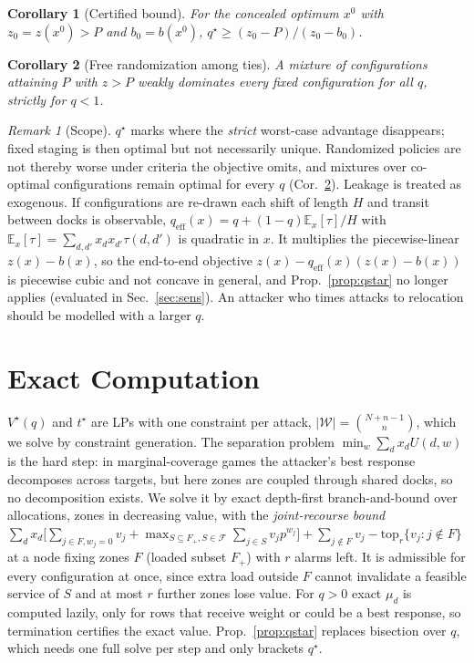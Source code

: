 \documentclass[letterpaper,journal]{IEEEtran}
\newtheorem{corollary}{Corollary}
\theoremstyle{remark}
\newtheorem{remark}{Remark}
\newcommand{\W}{\mathcal{W}}
\begin{document}
\begin{corollary}[Certified bound]\label{cor:lb}
For the concealed optimum $x^0$ with $z_0=z(x^0)>P$ and $b_0=b(x^0)$, $q^\star\ge(z_0-P)/(z_0-b_0)$.
\end{corollary}
\begin{corollary}[Free randomization among ties]\label{cor:ties}
A mixture of configurations attaining $P$ with $z>P$ weakly dominates every fixed configuration for all $q$, strictly for $q<1$.
\end{corollary}

\begin{remark}[Scope]\label{rem:scope}
$q^\star$ marks where the \emph{strict} worst-case advantage disappears; fixed staging is then optimal but not necessarily unique. Randomized policies are not thereby worse under criteria the objective omits, and mixtures over co-optimal configurations remain optimal for every $q$ (Cor.~\ref{cor:ties}). Leakage is treated as exogenous. If configurations are re-drawn each shift of length $H$ and transit between docks is observable, $q_{\mathrm{eff}}(x)=q+(1-q)\mathbb{E}_x[\tau]/H$ with $\mathbb{E}_x[\tau]=\sum_{d,d'}x_dx_{d'}\tau(d,d')$ is quadratic in $x$. It multiplies the piecewise-linear $z(x)-b(x)$, so the end-to-end objective $z(x)-q_{\mathrm{eff}}(x)(z(x)-b(x))$ is piecewise cubic and not concave in general, and Prop.~\ref{prop:qstar} no longer applies (evaluated in Sec.~\ref{sec:sens}). An attacker who times attacks to relocation should be modelled with a larger $q$.
\end{remark}

\section{Exact Computation}\label{sec:alg}
$V^\star(q)$ and $t^\star$ are LPs with one constraint per attack, $|\W|=\binom{N+n-1}{n}$, which we solve by constraint generation. The separation problem $\min_w\sum_dx_dU(d,w)$ is the hard step: in marginal-coverage games the attacker's best response decomposes across targets, but here zones are coupled through shared docks, so no decomposition exists. We solve it by exact depth-first branch-and-bound over allocations, zones in decreasing value, with the \emph{joint-recourse bound} $\sum_d x_d\big[\sum_{j\in F,w_j=0}v_j+\max_{S\subseteq F_+,S\in\mathcal{F}}\sum_{j\in S}v_jp^{w_j}\big]+\sum_{j\notin F}v_j-\mathrm{top}_r\{v_j:j\notin F\}$ at a node fixing zones $F$ (loaded subset $F_+$) with $r$ alarms left. It is admissible for every configuration at once, since extra load outside $F$ cannot invalidate a feasible service of $S$ and at most $r$ further zones lose value. For $q>0$ exact $\mu_d$ is computed lazily, only for rows that receive weight or could be a best response, so termination certifies the exact value. Prop.~\ref{prop:qstar} replaces bisection over $q$, which needs one full solve per step and only brackets $q^\star$.
\end{document}
